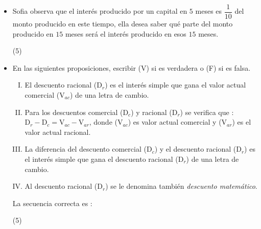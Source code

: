 \documentclass[10pt, twocolumn, landscape, a4paper]{article}
\begin{document}
\begin{itemize}
{}
\item{Sofia observa que el interés producido por un capital en $5$ meses es $\dfrac1{10}$ del monto producido en este tiempo, ella desea saber qué parte del monto producido en $15$ meses será el interés producido en esos $15$ meses.
\begin{tasks}(5)
\end{tasks}
}
\item{En las siguientes proposiciones, escribir (\textrm{V}) si es verdadera o (\textrm{F}) si es falsa.
\begin{enumerate}[I.]
\item{El descuento racional ($\mathrm{D}_r$) es el interés simple que gana el valor actual comercial ($\mathrm{V}_{ac}$) de una letra de cambio.}
\item{Para los descuentos comercial ($\mathrm{D}_c$) y racional ($\mathrm{D}_r$) se verifica que : $\mathrm{D}_r - \mathrm{D}_c = \mathrm{V}_{ac} - \mathrm{V}_{ar}$, donde ($\mathrm{V}_{ac}$) es valor actual comercial y ($\mathrm{V}_{ar}$) es el valor actual racional.}
\item{La diferencia del descuento comercial ($\mathrm{D}_c$) y el descuento racional ($\mathrm{D}_r$) es el interés simple que gana el descuento racional ($\mathrm{D}_r$) de una letra de cambio.}
\item{Al descuento racional ($\mathrm{D}_r$) se le denomina también \emph{descuento matemático}.}
\end{enumerate}
La secuencia correcta es :
\begin{tasks}(5)
\end{tasks}
}
\end{itemize}
\end{document}
